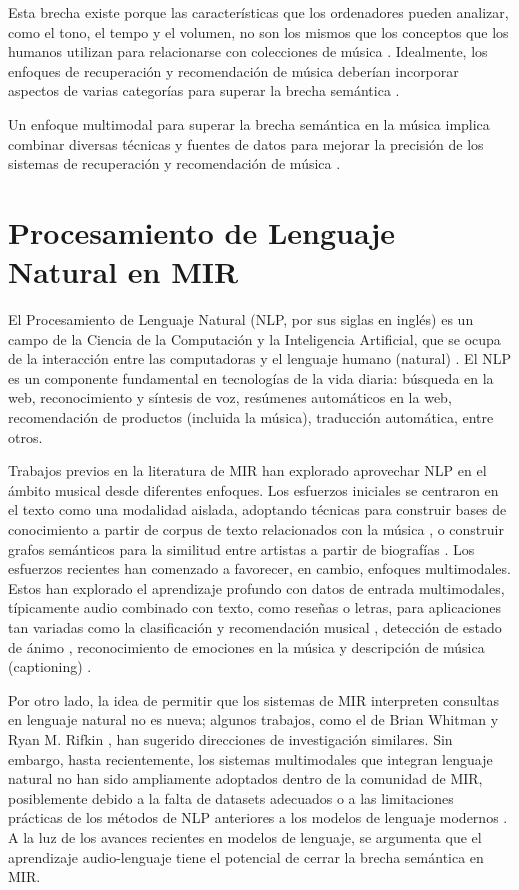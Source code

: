 Esta brecha existe porque las características que los ordenadores pueden analizar, como el tono, el tempo y el volumen, no son los mismos que los conceptos que los humanos utilizan para relacionarse con colecciones de música \cite{Celma2006BridgingTM}. Idealmente, los enfoques de recuperación y recomendación de música deberían incorporar aspectos de varias categorías para superar la brecha semántica \cite{Schedl2014MusicIR}.

Un enfoque multimodal para superar la brecha semántica en la música implica combinar diversas técnicas y fuentes de datos para mejorar la precisión de los sistemas de recuperación y recomendación de música \cite{Celma2006AMA}.

\section{Procesamiento de Lenguaje Natural en MIR}
\label{sec:NLP_in_MIR}

El Procesamiento de Lenguaje Natural (NLP, por sus siglas en inglés) es un campo de la Ciencia de la Computación y la Inteligencia Artificial, que se ocupa de la interacción entre las computadoras y el lenguaje humano (natural) \cite{NLP4MIR}. El NLP es un componente fundamental en tecnologías de la vida diaria: búsqueda en la web, reconocimiento y síntesis de voz, resúmenes automáticos en la web, recomendación de productos (incluida la música), traducción automática, entre otros.

Trabajos previos en la literatura de MIR han explorado aprovechar NLP en el ámbito musical desde diferentes enfoques. Los esfuerzos iniciales se centraron en el texto como una modalidad aislada, adoptando técnicas para construir bases de conocimiento a partir de corpus de texto relacionados con la música \cite{Oramas2016InformationEF}, o construir grafos semánticos para la similitud entre artistas a partir de biografías \cite{Oramas2015ASA}. Los esfuerzos recientes han comenzado a favorecer, en cambio, enfoques multimodales. Estos han explorado el aprendizaje profundo con datos de entrada multimodales, típicamente audio combinado con texto, como reseñas o letras, para aplicaciones tan variadas como la clasificación y recomendación musical \cite{Oramas2018MultimodalDL}, detección de estado de ánimo \cite{Delbouys2018MusicMD}, reconocimiento de emociones en la música \cite{Jeon2017MusicER} y descripción de música (captioning) \cite{Manco2021MusCapsGC, Cai2020MusicAA}.

Por otro lado, la idea de permitir que los sistemas de MIR interpreten consultas en lenguaje natural no es nueva; algunos trabajos, como el de Brian Whitman y Ryan M. Rifkin \cite{Whitman2002MusicalQA}, han sugerido direcciones de investigación similares. Sin embargo, hasta recientemente, los sistemas multimodales que integran lenguaje natural no han sido ampliamente adoptados dentro de la comunidad de MIR, posiblemente debido a la falta de datasets adecuados o a las limitaciones prácticas de los métodos de NLP anteriores a los modelos de lenguaje modernos \cite{Manco2022ContrastiveAL}. A la luz de los avances recientes en modelos de lenguaje, se argumenta que el aprendizaje audio-lenguaje tiene el potencial de cerrar la brecha semántica en MIR.

